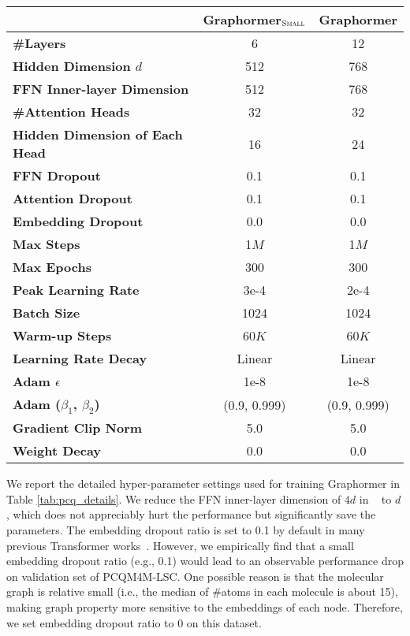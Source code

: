 \documentclass{article}
\begin{document}
\begin{table*}[ht]
\centering 
\caption{Model Configurations and Hyper-parameters of Graphormer on PCQM4M-LSC. } \label{tab:pcq_details}
\begin{threeparttable}
\begin{tabular}{lcc}
\toprule
& Graphormer$_{\small \textsc{Small}}$ & Graphormer \\ \hline
\textbf{\#Layers} & 6 & 12  \\ 
\textbf{Hidden Dimension $d$} & 512 & 768  \\ 
\textbf{FFN Inner-layer Dimension} & 512 & 768  \\ 
\textbf{\#Attention Heads} & 32 & 32  \\ 
\textbf{Hidden Dimension of Each Head} & 16 & 24  \\ 
\textbf{FFN Dropout} & 0.1 & 0.1  \\ 
\textbf{Attention Dropout} & 0.1 & 0.1 \\ 
\textbf{Embedding Dropout} & 0.0 & 0.0 \\ 
\textbf{Max Steps} & 1$M$ & 1$M$ \\
\textbf{Max Epochs} & 300 & 300 \\ 
\textbf{Peak Learning Rate} & 3e-4 & 2e-4 \\ 
\textbf{Batch Size} & 1024 & 1024 \\ 
\textbf{Warm-up Steps} & 60$K$ & 60$K$ \\ 
\textbf{Learning Rate Decay} & Linear & Linear  \\ 
\textbf{Adam $\epsilon$} & 1e-8 & 1e-8 \\ 
\textbf{Adam ($\beta_1$, $\beta_2$)} &  (0.9, 0.999) & (0.9, 0.999) \\ 
\textbf{Gradient Clip Norm} &  5.0 & 5.0  \\ 
\textbf{Weight Decay} & 0.0 & 0.0  \\ 
\bottomrule
\end{tabular}
\end{threeparttable}
\end{table*}

We report the detailed hyper-parameter settings used for training Graphormer in Table \ref{tab:pcq_details}. We reduce the FFN inner-layer dimension of $4d$ in ~\cite{vaswani2017attention} to $d$, which does not appreciably hurt the performance but significantly save the parameters. The embedding dropout ratio is set to 0.1 by default in many previous Transformer works~\cite{devlin2019bert,liu2019roberta}. However, we empirically find that a small embedding dropout ratio (e.g., 0.1) would lead to an observable performance drop on validation set of PCQM4M-LSC. One possible reason is that the molecular graph is relative small (i.e., the median of \#atoms in each molecule is about 15), making graph property more sensitive to the embeddings of each node. Therefore, we set embedding dropout ratio to 0 on this dataset.
\end{document}
